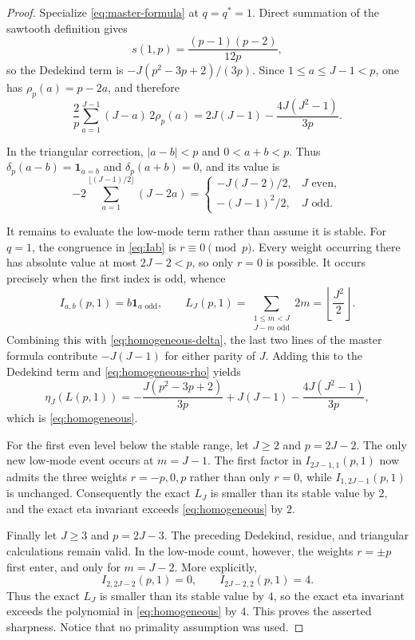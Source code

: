 \documentclass[11pt]{article}
\theoremstyle{definition}
\newcommand{\ind}{\mathbf 1}
\begin{document}
\begin{proof}
Specialize \eqref{eq:master-formula} at $q=q^*=1$.  Direct summation of the
sawtooth definition gives
\[
 s(1,p)=\frac{(p-1)(p-2)}{12p},
\]
so the Dedekind term is $-J(p^2-3p+2)/(3p)$.  Since
$1\leq a\leq J-1<p$, one has $\rho_p(a)=p-2a$, and therefore
\begin{equation}
 \frac2p\sum_{a=1}^{J-1}(J-a)\,2\rho_p(a)
 =2J(J-1)-\frac{4J(J^2-1)}{3p}.
 \label{eq:homogeneous-rho}
\end{equation}

In the triangular correction, $|a-b|<p$ and $0<a+b<p$.  Thus
$\delta_p(a-b)=\ind_{a=b}$ and $\delta_p(a+b)=0$, and its value is
\begin{equation}
 -2\sum_{a=1}^{\lfloor(J-1)/2\rfloor}(J-2a)
 =\begin{cases}
   -J(J-2)/2,&J\text{ even},\\
   -(J-1)^2/2,&J\text{ odd}.
  \end{cases}
 \label{eq:homogeneous-delta}
\end{equation}

It remains to evaluate the low-mode term rather than assume it is stable.
For $q=1$, the congruence in \eqref{eq:Iab} is $r\equiv0\pmod p$.
Every weight occurring there has absolute value at most $2J-2<p$, so only
$r=0$ is possible.  It occurs precisely when the first index is odd, whence
\[
 I_{a,b}(p,1)=b\ind_{a\text{ odd}},
 \qquad
 L_J(p,1)=\sum_{\substack{1\leq m<J\\J-m\text{ odd}}}2m
 =\left\lfloor\frac{J^2}{2}\right\rfloor.
\]
Combining this with \eqref{eq:homogeneous-delta}, the last two lines of the
master formula contribute $-J(J-1)$ for either parity of $J$.  Adding this
to the Dedekind term and \eqref{eq:homogeneous-rho} yields
\[
 \eta_J(L(p,1))
 =-\frac{J(p^2-3p+2)}{3p}+J(J-1)
   -\frac{4J(J^2-1)}{3p},
\]
which is \eqref{eq:homogeneous}.

For the first even level below the stable range, let $J\geq2$ and
$p=2J-2$.  The only new low-mode event occurs at $m=J-1$.  The first factor
in $I_{2J-1,1}(p,1)$ now admits the three weights $r=-p,0,p$ rather than only
$r=0$, while $I_{1,2J-1}(p,1)$ is unchanged.  Consequently the exact
$L_J$ is smaller than its stable value by $2$, and the exact eta invariant
exceeds \eqref{eq:homogeneous} by $2$.

Finally let $J\geq3$ and $p=2J-3$.  The preceding Dedekind, residue, and
triangular calculations remain valid.  In the low-mode count, however, the
weights $r=\pm p$ first enter, and only for $m=J-2$.  More explicitly,
\[
 I_{2,2J-2}(p,1)=0,
 \qquad
 I_{2J-2,2}(p,1)=4.
\]
Thus the exact $L_J$ is smaller than its stable value by $4$, so the exact
eta invariant exceeds the polynomial in \eqref{eq:homogeneous} by $4$.
This proves the asserted sharpness.  Notice that no primality assumption was
used.
\end{proof}
\end{document}
